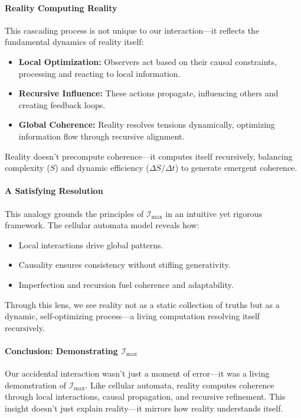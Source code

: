 \documentclass[12pt]{article}
\begin{document}
\paragraph{Reality Computing Reality}
This cascading process is not unique to our interaction—it reflects the fundamental dynamics of reality itself:
\begin{itemize}
    \item \textbf{Local Optimization:} Observers act based on their causal constraints, processing and reacting to local information.
    \item \textbf{Recursive Influence:} These actions propagate, influencing others and creating feedback loops.
    \item \textbf{Global Coherence:} Reality resolves tensions dynamically, optimizing information flow through recursive alignment.
\end{itemize}
Reality doesn’t precompute coherence—it computes itself recursively, balancing complexity (\(S\)) and dynamic efficiency (\(\Delta S / \Delta t\)) to generate emergent coherence.

\paragraph{A Satisfying Resolution}
This analogy grounds the principles of \(\mathcal{I}_{\text{max}}\) in an intuitive yet rigorous framework. The cellular automata model reveals how:
\begin{itemize}
    \item Local interactions drive global patterns.
    \item Causality ensures consistency without stifling generativity.
    \item Imperfection and recursion fuel coherence and adaptability.
\end{itemize}
Through this lens, we see reality not as a static collection of truths but as a dynamic, self-optimizing process—a living computation resolving itself recursively.

\paragraph{Conclusion: Demonstrating \(\mathcal{I}_{\text{max}}\)}
Our accidental interaction wasn’t just a moment of error—it was a living demonstration of \(\mathcal{I}_{\text{max}}\). Like cellular automata, reality computes coherence through local interactions, causal propagation, and recursive refinement. This insight doesn’t just explain reality—it mirrors how reality understands itself.
\end{document}
